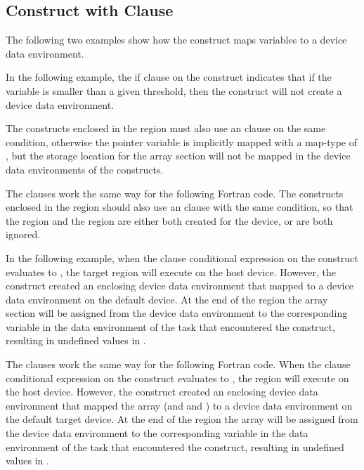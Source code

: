
\subsection{  Construct with  Clause}
\label{subsec:target_data_if}

The following two examples show how the   construct 
maps variables to a device data environment.

In the following example, the if clause on the   construct 
indicates that if the variable  is smaller than a given threshold, then the  
 construct will not create a device data environment.

The  constructs enclosed in the   region 
must also use an  clause on the same condition, otherwise the pointer 
variable  is implicitly mapped with a map-type of , but the storage 
location for the array section  will not be mapped in the device data environments 
of the  constructs.


\pagebreak
The  clauses work the same way for the following Fortran code. The  
constructs enclosed in the   region should also use 
an  clause with the same condition, so that the   
region and the  region are either both created for the device, or 
are both ignored.


\pagebreak
In the following example, when the  clause conditional expression on 
the  construct evaluates to , the target region will 
execute on the host device. However, the   construct 
created an enclosing device data environment that mapped  to a device data 
environment on the default device. At the end of the   
region the array section  will be assigned from the device data environment 
to the corresponding variable in the data environment of the task that encountered 
the   construct, resulting in undefined values in .


\pagebreak
The  clauses work the same way for the following Fortran code. When 
the  clause conditional expression on the  construct 
evaluates to , the  region will execute on the host 
device. However, the   construct created an enclosing 
device data environment that mapped the  array (and  and ) to a device data 
environment on the default target device. At the end of the   
region the  array will be assigned from the device data environment to the corresponding 
variable in the data environment of the task that encountered the  
 construct, resulting in undefined values in .


